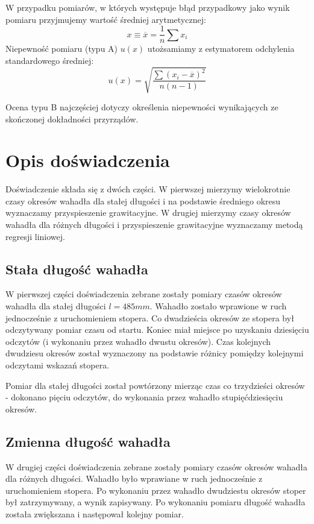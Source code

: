 \documentclass[a4paper,10pt,twoside]{article}
\begin{document}
W przypadku pomiarów, w których występuje błąd przypadkowy jako wynik pomiaru przyjmujemy wartość średniej arytmetycznej: $$ x \equiv \overline{x} =  \frac{1}{n}\sum{x_i}$$ Niepewność pomiaru (typu A) $u(x)$ utożsamiamy z estymatorem odchylenia standardowego średniej: $$u(x) = \sqrt{\frac{\sum{(x_i-\overline{x})^2}}{n(n-1)}} $$

Ocena typu B najczęściej dotyczy określenia niepewności wynikających ze skończonej dokładności przyrządów. 

\section{Opis doświadczenia}

Doświadczenie składa się z dwóch części. W pierwszej mierzymy wielokrotnie czasy okresów wahadła dla stałej długości i na podstawie średniego okresu wyznaczamy przyspieszenie grawitacyjne. W drugiej mierzymy czasy okresów wahadła dla różnych długości i przyspieszenie grawitacyjne wyznaczamy metodą regresji liniowej.

\subsection{Stała długość wahadła}

W pierwszej części doświadczenia zebrane zostały pomiary czasów okresów wahadła dla stałej długości $l = 485 \unit{mm}$. Wahadło zostało wprawione w ruch jednocześnie z uruchomieniem stopera. Co dwadzieścia okresów ze stopera był odczytywany pomiar czasu od startu. Koniec miał miejsce po uzyskaniu dziesięciu odczytów (i wykonaniu przez wahadło dwustu okresów). Czas kolejnych dwudziesu okresów został wyznaczony na podstawie różnicy pomiędzy kolejnymi odczytami wskazań stopera.

Pomiar dla stałej długości został powtórzony mierząc czas co trzydzieści okresów - dokonano pięciu odczytów, do wykonania przez wahadło stupięćdziesięciu okresów.

\subsection{Zmienna długość wahadła}

W drugiej części doświadczenia zebrane zostały pomiary czasów okresów wahadła dla różnych długości. Wahadło było wprawiane w ruch jednocześnie z uruchomieniem stopera. Po wykonaniu przez wahadło dwudziestu okresów stoper był zatrzymywany, a wynik zapisywany. Po wykonaniu pomiaru długość wahadła została zwiększana i następował kolejny pomiar.
\end{document}
